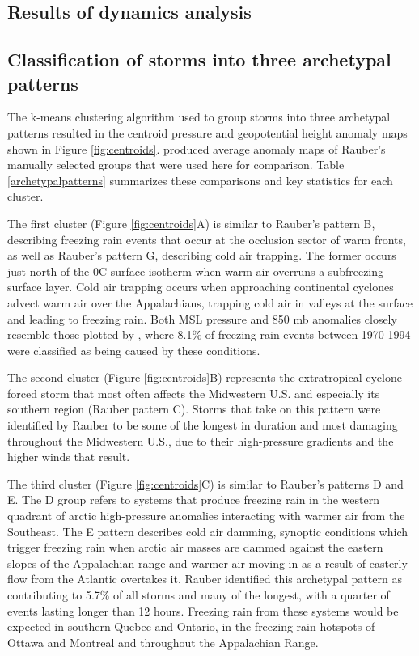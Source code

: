 \documentclass[twocol]{ametsoc}
\begin{document}
\subsection{Results of dynamics analysis}
\subsection{Classification of storms into three archetypal patterns}
The k-means clustering algorithm used to group storms into three archetypal patterns resulted in the centroid pressure and geopotential height anomaly maps shown in Figure \ref{fig:centroids}. \citet{erfani2012automated} produced average anomaly maps of Rauber's manually selected groups that were used here for comparison. Table \ref{archetypalpatterns} summarizes these comparisons and key statistics for each cluster.

The first cluster (Figure \ref{fig:centroids}A) is similar to Rauber's pattern B, describing freezing rain events that occur at the occlusion sector of warm fronts, as well as Rauber's pattern G, describing cold air trapping. The former occurs just north of the 0\degree C surface isotherm when warm air overruns a subfreezing surface layer. Cold air trapping occurs when approaching continental cyclones advect warm air over the Appalachians, trapping cold air in valleys at the surface and leading to freezing rain. Both MSL pressure and 850 mb anomalies closely resemble those plotted by \citet{rauber2001synoptic}, where  8.1\% of freezing rain events between 1970-1994 were classified as being caused by these conditions. 

The second cluster (Figure \ref{fig:centroids}B) represents the extratropical cyclone-forced storm that most often affects the Midwestern U.S. and especially its southern region (Rauber pattern C). Storms that take on this pattern were identified by Rauber to be some of the longest in duration and most damaging throughout the Midwestern U.S., due to their high-pressure gradients and the higher winds that result. 

The third cluster (Figure \ref{fig:centroids}C) is similar to Rauber's patterns D and E. The D group refers to systems that produce freezing rain in the western quadrant of arctic high-pressure anomalies interacting with warmer air from the Southeast. The E pattern describes cold air damming, synoptic conditions which trigger freezing rain when arctic air masses are dammed against the eastern slopes of the Appalachian range and warmer air moving in as a result of easterly flow from the Atlantic overtakes it. Rauber identified this archetypal pattern as contributing to 5.7\% of all storms and many of the longest, with a quarter of events lasting longer than 12 hours. Freezing rain from these systems would be expected in southern Quebec and Ontario, in the freezing rain hotspots of Ottawa and Montreal and throughout the Appalachian Range. 
\end{document}
